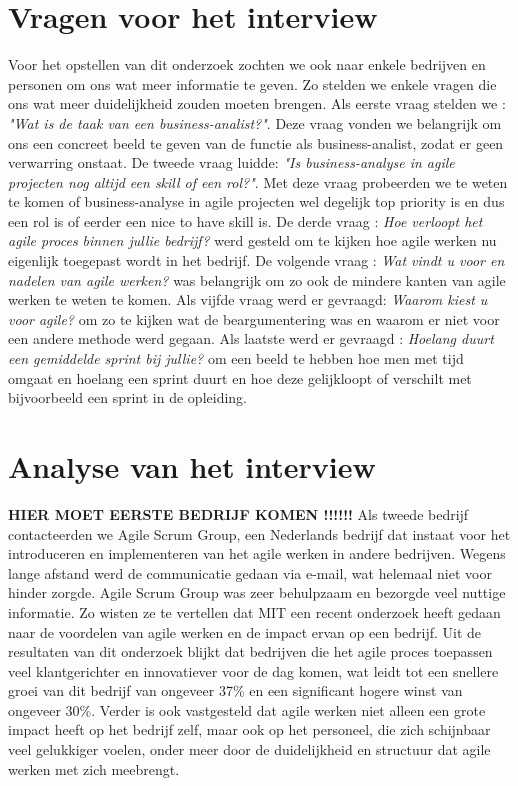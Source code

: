 \documentclass{hogent-article}
\begin{document}
\section{Vragen voor het interview}
Voor het opstellen van dit onderzoek zochten we ook naar enkele bedrijven en personen om ons wat meer informatie te geven. Zo stelden we enkele vragen die ons wat meer duidelijkheid zouden moeten brengen. Als eerste vraag stelden we : \textit{"Wat is de taak van een business-analist?"}. Deze vraag vonden we belangrijk om ons een concreet beeld te geven van de functie als business-analist, zodat er geen verwarring onstaat. De tweede vraag luidde: \textit{"Is business-analyse in agile projecten nog altijd een skill of een rol?"}. Met deze vraag probeerden we te weten te komen of business-analyse in agile projecten wel degelijk top priority is en dus een rol is of eerder een nice to have skill is. De derde vraag : \textit{Hoe verloopt het agile proces binnen jullie bedrijf?} werd gesteld om te kijken hoe agile werken nu eigenlijk toegepast wordt in het bedrijf. De volgende vraag : \textit{Wat vindt u voor en nadelen van agile werken?} was belangrijk om zo ook de mindere kanten van agile werken te weten te komen. Als vijfde vraag werd er gevraagd: \textit{Waarom kiest u voor agile?} om zo te kijken wat de beargumentering was en waarom er niet voor een andere methode werd gegaan. Als laatste werd er gevraagd : \textit{Hoelang duurt een gemiddelde sprint bij jullie?} om een beeld te hebben hoe men met tijd omgaat en hoelang een sprint duurt en hoe deze gelijkloopt of verschilt met bijvoorbeeld een sprint in de opleiding.



\section{Analyse van het interview}
\textbf{HIER MOET EERSTE BEDRIJF KOMEN !!!!!!}
Als tweede bedrijf contacteerden we Agile Scrum Group, een Nederlands bedrijf dat instaat voor het introduceren en implementeren van het agile werken in andere bedrijven. Wegens lange afstand werd de communicatie gedaan via e-mail, wat helemaal niet voor hinder zorgde. Agile Scrum Group was zeer behulpzaam en bezorgde veel nuttige informatie. Zo wisten ze te vertellen dat MIT een recent onderzoek heeft gedaan naar de voordelen van agile werken en de impact ervan op een bedrijf.
Uit de resultaten van dit onderzoek blijkt dat bedrijven die het agile proces toepassen veel klantgerichter en innovatiever voor de dag komen, wat leidt tot een snellere groei van dit bedrijf van ongeveer 37\% en een significant hogere winst van ongeveer 30\%. 
Verder is ook vastgesteld dat agile werken niet alleen een grote impact heeft op het bedrijf zelf, maar ook op het personeel, die zich schijnbaar veel gelukkiger voelen, onder meer door de duidelijkheid en structuur dat agile werken met zich meebrengt.
\end{document}
